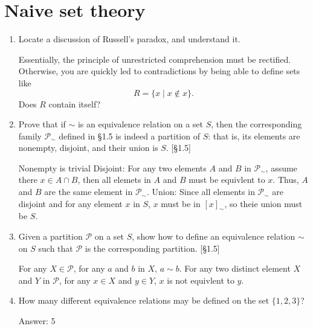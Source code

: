 \section{Naive set theory}
\begin{enumerate}
    \item Locate a discussion of Russell's paradox, and understand it.
    \begin{solution}
        Essentially, the principle of unrestricted comprehension must be rectified. Otherwise, you are quickly led to contradictions by being able to define sets like
        \[R = \{ x \mid x \notin x\}.\]
        Does $R$ contain itself?
    \end{solution}

    \item Prove that if $\sim$ is an equivalence relation on a set $S$, then the corresponding family $\mathcal{P}_{\sim}$ defined in \S1.5 is indeed a partition of $S$: that is, its elements are nonempty, disjoint, and their union is $S$. [\S1.5]
    \begin{solution}
            Nonempty is trivial
            Disjoint: For any two elements $A$ and $B$ in $\mathcal{P}_{\sim}$, assume there $x\in A\cap B $, then all elemets in $A$ and $B$ must be equivlent to $x$. Thus, $A$ and $B$ are the same element in $\mathcal{P}_{\sim}$. 
            Union: Since all elements in $\mathcal{P}_{\sim}$ are disjoint and for any element $x$ in $S$, $x$ must be in $[x]_{\sim}$, so theie union must be $S$. 
    \end{solution}
    \item Given a partition $\mathcal{P}$ on a set $S$, show how to define an equivalence relation $\sim$ on $S$ such that $\mathcal{P}$ is the corresponding partition. [\S1.5]
        \begin{solution} 
            For any $X \in \mathcal{P}$, for any $a$ and $b$ in $X$, $a\sim b$. 
            For any two distinct element $X$ and $Y$ in $\mathcal{P}$, for any $x\in X$ and $y\in Y$, $x$ is not equivlent to $y$. 
        \end{solution}
    \item How many different equivalence relations may be defined on the set $\{1, 2, 3\}$?
        \begin{solution}
                Answer: 5


\end{solution}
\end{enumerate}
